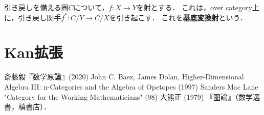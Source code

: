 \documentclass[uplatex,dvipdfmx]{jsreport}
\begin{document}
\begin{definition}
    引き戻しを備える圏$C$について，$f:X\to Y$を射とする．
    これは，over category上に，引き戻し関手$f^*:C/Y\to C/X$を引き起こす．
    これを\textbf{基底変換射}という．
\end{definition}

\section{Kan拡張}



\begin{thebibliography}{9}
    斎藤毅『数学原論』(2020)
    John C. Baez, James Dolan, Higher-Dimensional Algebra III: n-Categories and the Algebra of Opetopes (1997)
    Sanders Mac Lane "Category for the Working Mathematicians" (98)
    大熊正 (1979) 『圏論』（数学選書，槙書店）．
\end{thebibliography}
\end{document}
